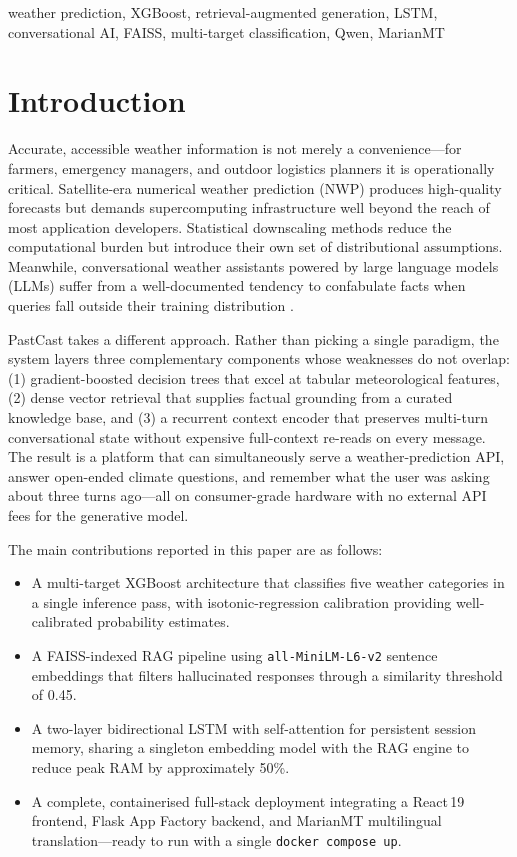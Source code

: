\documentclass[conference]{IEEEtran}
\begin{document}
\begin{IEEEkeywords}
weather prediction, XGBoost, retrieval-augmented generation, LSTM, conversational AI, FAISS, multi-target classification, Qwen, MarianMT
\end{IEEEkeywords}

\section{Introduction}
\label{sec:intro}

Accurate, accessible weather information is not merely a convenience---for farmers, emergency managers, and outdoor logistics planners it is operationally critical. Satellite-era numerical weather prediction (NWP) produces high-quality forecasts but demands supercomputing infrastructure well beyond the reach of most application developers. Statistical downscaling methods reduce the computational burden but introduce their own set of distributional assumptions. Meanwhile, conversational weather assistants powered by large language models (LLMs) suffer from a well-documented tendency to confabulate facts when queries fall outside their training distribution \cite{lewis2020rag}.

PastCast takes a different approach. Rather than picking a single paradigm, the system layers three complementary components whose weaknesses do not overlap: (1) gradient-boosted decision trees that excel at tabular meteorological features, (2) dense vector retrieval that supplies factual grounding from a curated knowledge base, and (3) a recurrent context encoder that preserves multi-turn conversational state without expensive full-context re-reads on every message. The result is a platform that can simultaneously serve a weather-prediction API, answer open-ended climate questions, and remember what the user was asking about three turns ago---all on consumer-grade hardware with no external API fees for the generative model.

The main contributions reported in this paper are as follows:

\begin{itemize}
    \item A multi-target XGBoost architecture that classifies five weather categories in a single inference pass, with isotonic-regression calibration providing well-calibrated probability estimates.
    \item A FAISS-indexed RAG pipeline using \texttt{all-MiniLM-L6-v2} sentence embeddings that filters hallucinated responses through a similarity threshold of 0.45.
    \item A two-layer bidirectional LSTM with self-attention for persistent session memory, sharing a singleton embedding model with the RAG engine to reduce peak RAM by approximately 50\%.
    \item A complete, containerised full-stack deployment integrating a React\,19 frontend, Flask App Factory backend, and MarianMT multilingual translation---ready to run with a single \texttt{docker compose up}.
\end{itemize}
\end{document}
